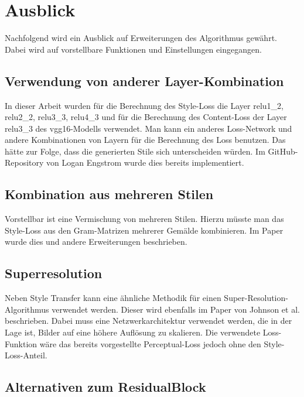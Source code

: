 \section{Ausblick}

Nachfolgend wird ein Ausblick auf Erweiterungen des Algorithmus gewährt. Dabei wird auf vorstellbare Funktionen und Einstellungen eingegangen.

\subsection{Verwendung von anderer Layer-Kombination}

In dieser Arbeit wurden für die Berechnung des Style-Loss die Layer relu1\_2, relu2\_2, relu3\_3, relu4\_3 und für die Berechnung des Content-Loss der Layer relu3\_3 des \gls{vgg16}-Modells verwendet. Man kann ein anderes Loss-Network und andere Kombinationen von Layern für die Berechnung des Loss benutzen. Das hätte zur Folge, dass die generierten Stile sich unterscheiden würden. Im GitHub-Repository von Logan Engstrom  \cite{engstrom2016faststyletransfer} wurde dies bereits implementiert.

\subsection{Kombination aus mehreren Stilen}
\label{sec:combination_many_styles}

Vorstellbar ist eine Vermischung von mehreren Stilen. Hierzu müsste man das Style-Loss aus den Gram-Matrizen mehrerer Gemälde kombinieren. Im Paper \cite{stanfordStyleTransfer} wurde dies und andere Erweiterungen beschrieben.

\subsection{Superresolution}
\label{sec:superresolution}

Neben Style Transfer kann eine ähnliche Methodik für einen Super-Resolution-Algorithmus verwendet werden. Dieser wird ebenfalls im Paper von Johnson et al. \cite{DBLP:journals/corr/JohnsonAL16} beschrieben. Dabei muss eine Netzwerkarchitektur verwendet werden, die in der Lage ist, Bilder auf eine höhere Auflösung zu skalieren. Die verwendete Loss-Funktion wäre das bereits vorgestellte Perceptual-Loss jedoch ohne den Style-Loss-Anteil.

\subsection{Alternativen zum ResidualBlock}
\label{sec:alternatives_to_residual_block}

